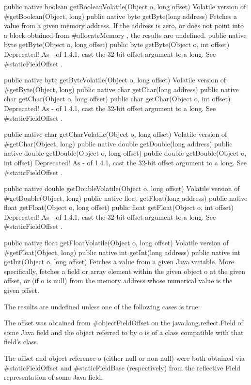  public native boolean getBooleanVolatile(Object o,
    long offset)
Volatile version of #getBoolean(Object, long) 
 public native byte getByte(long address)
Fetches a value from a given memory address.  If the address is zero, or
does not point into a block obtained from #allocateMemory , the
results are undefined.
 public native byte getByte(Object o,
    long offset)
 public byte getByte(Object o,
    int offset) 
Deprecated! As - of 1.4.1, cast the 32-bit offset argument to a long. See #staticFieldOffset .

 public native byte getByteVolatile(Object o,
    long offset)
Volatile version of #getByte(Object, long) 
 public native char getChar(long address)
 public native char getChar(Object o,
    long offset)
 public char getChar(Object o,
    int offset) 
Deprecated! As - of 1.4.1, cast the 32-bit offset argument to a long. See #staticFieldOffset .

 public native char getCharVolatile(Object o,
    long offset)
Volatile version of #getChar(Object, long) 
 public native double getDouble(long address)
 public native double getDouble(Object o,
    long offset)
 public double getDouble(Object o,
    int offset) 
Deprecated! As - of 1.4.1, cast the 32-bit offset argument to a long. See #staticFieldOffset .

 public native double getDoubleVolatile(Object o,
    long offset)
Volatile version of #getDouble(Object, long) 
 public native float getFloat(long address)
 public native float getFloat(Object o,
    long offset)
 public float getFloat(Object o,
    int offset) 
Deprecated! As - of 1.4.1, cast the 32-bit offset argument to a long. See #staticFieldOffset .

 public native float getFloatVolatile(Object o,
    long offset)
Volatile version of #getFloat(Object, long) 
 public native int getInt(long address)
 public native int getInt(Object o,
    long offset)
Fetches a value from a given Java variable.
More specifically, fetches a field or array element within the given
object o at the given offset, or (if o is
null) from the memory address whose numerical value is the given
offset.

The results are undefined unless one of the following cases is true:


The offset was obtained from #objectFieldOffset  on
the java.lang.reflect.Field  of some Java field and the object
referred to by o is of a class compatible with that
field's class.

The offset and object reference o (either null or
non-null) were both obtained via #staticFieldOffset 
and #staticFieldBase  (respectively) from the
reflective Field  representation of some Java field.

